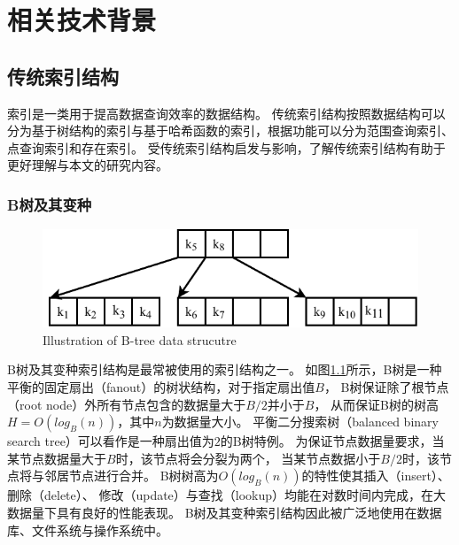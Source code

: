 \chapter{相关技术背景}
\label{chap:back}

\section{传统索引结构}

索引是一类用于提高数据查询效率的数据结构。
传统索引结构按照数据结构可以分为基于树结构的索引与基于哈希函数的索引，根据功能可以分为范围查询索引、点查询索引和存在索引。
{\li}受传统索引结构启发与影响，了解传统索引结构有助于更好理解{\li}与本文的研究内容。

\subsection{B树及其变种}

\begin{figure}[!htp]
  \centering
  \includegraphics{figure/btree.pdf}
    {Illustration of B-tree data strucutre}
  \label{fig:btree}
\end{figure}

B树及其变种索引结构是最常被使用的索引结构之一\cite{graefe2001b}。
如图\ref{fig:btree}所示，B树是一种平衡的固定扇出（fanout）的树状结构，对于指定扇出值$B$，
B树保证除了根节点（root node）外所有节点包含的数据量大于$B/2$并小于$B$，
从而保证B树的树高$H=O(log_B(n))$，其中$n$为数据量大小。
平衡二分搜索树（balanced binary search tree）可以看作是一种扇出值为$2$的B树特例。
为保证节点数据量要求，当某节点数据量大于$B$时，该节点将会分裂为两个，
当某节点数据小于$B/2$时，该节点将与邻居节点进行合并。
B树树高为$O(log_B(n))$的特性使其插入（insert）、删除（delete）、
修改（update）与查找（lookup）均能在对数时间内完成，在大数据量下具有良好的性能表现。
B树及其变种索引结构因此被广泛地使用在数据库、文件系统与操作系统中。


